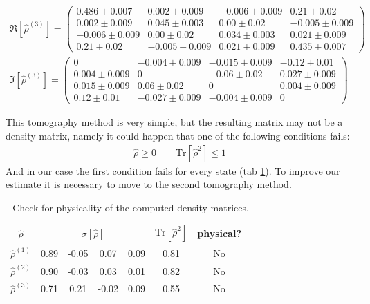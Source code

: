 \documentclass[a4paper, 11pt]{article}
\begin{document}
\begin{gather*}
        \\
        \Re[\hat{\rho}^{(3)}] =
        \begin{pmatrix}
          0.486 \pm 0.007 & 0.002 \pm 0.009 & -0.006 \pm 0.009 & 0.21 \pm 0.02 \\
          0.002 \pm 0.009 & 0.045 \pm 0.003 & 0.00 \pm 0.02 & -0.005 \pm 0.009 \\
          -0.006 \pm 0.009 & 0.00 \pm 0.02 & 0.034 \pm 0.003 & 0.021 \pm 0.009 \\
          0.21 \pm 0.02 & -0.005 \pm 0.009 & 0.021 \pm 0.009 & 0.435 \pm 0.007
        \end{pmatrix}
        \\
        \Im[\hat{\rho}^{(3)}] =
        \begin{pmatrix}
          0 & -0.004 \pm 0.009 & -0.015 \pm 0.009 & -0.12 \pm 0.01 \\
          0.004 \pm 0.009 & 0 & -0.06 \pm 0.02 & 0.027 \pm 0.009 \\
          0.015 \pm 0.009 & 0.06 \pm 0.02 & 0 & 0.004 \pm 0.009 \\
          0.12 \pm 0.01 & -0.027 \pm 0.009 & -0.004 \pm 0.009 & 0
        \end{pmatrix}
      \end{gather*}

      This tomography method is very simple, but the resulting matrix may not be a density matrix, namely it could happen that one of the following conditions fails:
      \begin{gather*}
        \hat{\rho} \ge 0 \qquad \text{Tr}[\hat{\rho}^2] \le 1
      \end{gather*}
      And in our case the first condition fails for every state (tab \ref{tab:tomo_phys}). To improve our estimate it is necessary to move to the second tomography method.

      \begin{table}[H]
        \centering
        \begin{tabular}{cccccccc}
          \toprule
          $\hat{\rho}$ & \multicolumn{4}{c}{$\sigma[\hat{\rho}]$} & $\text{Tr}[\hat{\rho}^2]$ & physical? \\
          \midrule
          $\hat{\rho}^{(1)}$ & 0.89 & -0.05 & 0.07 & 0.09 & 0.81 & No \\
          $\hat{\rho}^{(2)}$ & 0.90 & -0.03 & 0.03 & 0.01 & 0.82 & No \\
          $\hat{\rho}^{(3)}$ & 0.71 & 0.21 & -0.02 & 0.09 & 0.55 & No \\
          \bottomrule
        \end{tabular}
        \caption{Check for physicality of the computed density matrices.}
        \label{tab:tomo_phys}
      \end{table}
\end{document}
